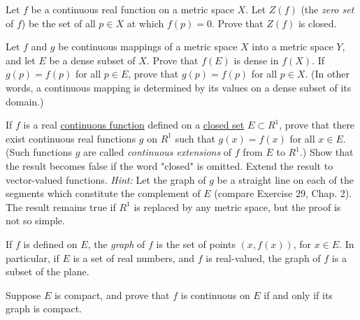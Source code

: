   \begin{exercise}[Rudin 4.3]
    Let $f$ be a continuous real function on a metric space $X$. Let $Z(f)$ (the \textit{zero set} of $f$) be the set of all $p \in X$ at which $f(p) = 0$. Prove that $Z(f)$ is closed.
  \end{exercise}
  \begin{solution}

  \end{solution}

  \begin{exercise}[Rudin 4.4]
    Let $f$ and $g$ be continuous mappings of a metric space $X$ into a metric space $Y$, and let $E$ be a dense subset of $X$. Prove that $f(E)$ is dense in $f(X)$. If $g(p) = f(p)$ for all $p \in E$, prove that $g(p) = f(p)$ for all $p \in X$. (In other words, a continuous mapping is determined by its values on a dense subset of its domain.)
  \end{exercise}
  \begin{solution}

  \end{solution}

  \begin{exercise}[Rudin 4.5]
    If $f$ is a real \hyperref[pst-def:continuous_func]{continuous function} defined on a \hyperref[pst-def:closed]{closed set} $E \subset R^1$, prove that there exist continuous real functions $g$ on $R^1$ such that $g(x) = f(x)$ for all $x \in E$. (Such functions $g$ are called \textit{continuous extensions} of $f$ from $E$ to $R^1$.) Show that the result becomes false if the word "closed" is omitted. Extend the result to vector-valued functions. \textit{Hint:} Let the graph of $g$ be a straight line on each of the segments which constitute the complement of $E$ (compare Exercise 29, Chap. 2). The result remains true if $R^1$ is replaced by any metric space, but the proof is not so simple.
  \end{exercise}
  \begin{solution}

  \end{solution}

  \begin{exercise}[Rudin 4.6]
    If $f$ is defined on $E$, the \textit{graph} of $f$ is the set of points $(x, f(x))$, for $x \in E$. In particular, if $E$ is a set of real numbers, and $f$ is real-valued, the graph of $f$ is a subset of the plane.
    \par Suppose $E$ is compact, and prove that $f$ is continuous on $E$ if and only if its graph is compact.
  \end{exercise}
  \begin{solution}

  \end{solution}

